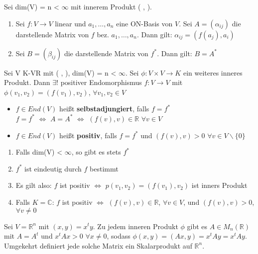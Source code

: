 \begin{lemma}
Sei dim(V) = n < $\infty$ mit innerem Produkt ( , ).
\begin{enumerate}
\item Sei $f: V \to V$ linear und $a_1, …, a_n$ eine ON-Basis von $V$. Sei $A = (\alpha_{ij})$ die darstellende Matrix von $f$ bez. $a_1, …, a_n$. Dann gilt: $\alpha_{ij} = (f(a_j), a_i)$
\item Sei $B = (\beta_{ij})$ die darstellende Matrix von $f^*$. Dann gilt: $B = A^*$
\end{enumerate}
\end{lemma}

\begin{theorem}
Sei V K-VR mit ( , ), dim(V) = n < $\infty$. Sei $\phi: V \times V \to K$ ein weiteres inneres Produkt. Dann $\exists !$ positiver Endomorphismus $f: V \to V$ mit $\phi(v_1, v_2) = (f(v_1), v_2)$, $\forall v_1, v_2 \in V$
\end{theorem}
\begin{definition}
\leavevmode
\begin{itemize}
\item $f \in End(V)$ heißt \textbf{selbstadjungiert}, falls $f = f^*$\\
$f = f^*$ $\Leftrightarrow$ $A = A^*$ $\Leftrightarrow$ $(f(v), v) \in \mathbb{R}$ $\forall v \in V$
\item $f \in End(V)$ heißt \textbf{positiv}, falls $f= f^*$ und $(f(v), v) > 0$ $\forall v \in V \backslash \{0\}$
\end{itemize}
\end{definition}
\begin{remark}
\leavevmode
\begin{enumerate}
\item Falls dim(V) < $\infty$, so gibt es stets $f^*$
\item $f^*$ ist eindeutig durch $f$ bestimmt
\item Es gilt also: $f$ ist positiv $\Leftrightarrow$ $p(v_1, v_2) = (f(v_1), v_2)$ ist inners Produkt
\item Falls $K = \mathbb{C}$: $f$ ist positiv $\Leftrightarrow$ $(f(v), v) \in \mathbb{R}$, $\forall v \in V$, und $(f(v), v) > 0$, $\forall v \neq 0$
\end{enumerate}
\end{remark}
\begin{remark}
Sei $V = \mathbb{R}^n$ mit $(x, y) = x^ty$. Zu jedem inneren Produkt $\phi$ gibt es $A \in M_n(\mathbb{R})$ mit $A = A^t$ und $x^tAx > 0$ $\forall x \neq 0$, sodass $\phi (x, y) = (Ax, y) = x^tAy = x^tAy$.\\
Umgekehrt definiert jede solche Matrix ein Skalarprodukt auf $\mathbb{R}^n$.
\end{remark}

